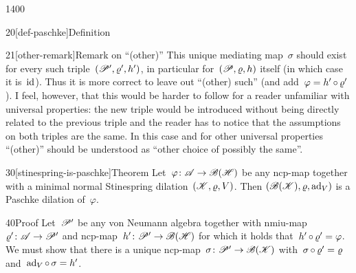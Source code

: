 \begin{parsec}{1400}
\begin{point}{20}[def-paschke]{Definition}
\begin{point}{21}[other-remark]{Remark on ``(other)''}
This unique mediating map~$\sigma$ should exist for every
    such triple~$(\mathscr{P}',\varrho',h')$,
    in particular for~$(\mathscr{P}, \varrho, h)$ itself (in which case it is~$\mathrm{id}$).
Thus it is more correct to leave out ``(other) such'' (and add~$\varphi=h' \mathop{\circ} \varrho'$).
I feel, however, that this would be harder to follow for a reader
    unfamiliar with universal properties:
        the new triple would be introduced without being directly related
            to the previous triple and the reader has to
            notice that the assumptions on both triples are the same.
In this case and for other universal properties
    ``(other)'' should be understood as ``other choice of possibly the same''.
\end{point}
\end{point}
\begin{point}{30}[stinespring-is-paschke]{Theorem}%
Let~$\varphi\colon \mathscr{A} \to \mathscr{B}(\mathscr{H})$
    be any ncp-map
    together with a minimal normal Stinespring dilation~$(\mathscr{K},\varrho,V)$.
    Then $(\mathscr{B}(\mathscr{K}), \varrho, \mathrm{ad}_V)$
        is a Paschke dilation of~$\varphi$.

\begin{point}{40}{Proof}%
Let~$\mathscr{P}'$ be any von Neumann algebra
    together with nmiu-map~$\varrho'\colon \mathscr{A} \to \mathscr{P}'$
    and ncp-map~$h'\colon \mathscr{P}' \to \mathscr{B}(\mathscr{H})$
    for which it holds that~$h' \mathop{\circ} \varrho' = \varphi$.
We must show that there is a unique
    ncp-map~$\sigma\colon \mathscr{P}' \to \mathscr{B}(\mathscr{K})$
    with~$\sigma \mathop{\circ} \varrho' = \varrho$
    and~$\mathrm{ad}_V \mathop{\circ} \sigma = h'$.


\end{point}
\end{point}
\end{parsec}
